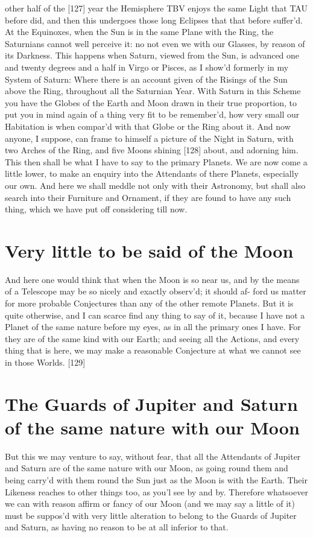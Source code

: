 \documentclass[letterpaper]{book}
\begin{document}
other half of the [127] year the Hemisphere TBV enjoys the same Light that
TAU before did, and then this undergoes those long Eclipses that that before
suffer'd. At the Equinoxes, when the Sun is in the same Plane with the Ring,
the Saturnians cannot well perceive it: no not even we with our Glasses, by
reason of its Darkness. This happens when Saturn, viewed from the Sun, is
advanced one and twenty degrees and a half in Virgo or Pisces, as I show'd
formerly in my System of Saturn: Where there is an account given of the
Risings of the Sun above the Ring, throughout all the Saturnian Year.  With
Saturn in this Scheme you have the Globes of the Earth and Moon drawn in
their true proportion, to put you in mind again of a thing very fit to be
remember'd, how very small our Habitation is when compar'd with that Globe
or the Ring about it. And now anyone, I suppose, can frame to himself a
picture of the Night in Saturn, with two Arches of the Ring, and five Moons
shining [128] about, and adorning him. This then shall be what I have to say
to the primary Planets.  We are now come a little lower, to make an enquiry
into the Attendants of there Planets, especially our own. And here we shall
meddle not only with their Astronomy, but shall also search into their
Furniture and Ornament, if they are found to have any such thing, which we
have put off considering till now.


\section{Very little to be said of the Moon}

And here one would think that when the Moon is so near us, and by the
means of a Telescope may be so nicely and exactly observ'd; it should af-
ford us matter for more probable Conjectures than any of the other remote
Planets. But it is quite otherwise, and I can scarce find any thing to say
of it, because I have not a Planet of the same nature before my eyes, as in
all the primary ones I have. For they are of the same kind with our Earth;
and seeing all the Actions, and every thing that is here, we may make a
reasonable Conjecture at what we cannot see in those Worlds.
[129]


\section{The Guards of Jupiter and Saturn of the same nature with our Moon}

But this we may venture to say, without fear, that all the Attendants of
Jupiter and Saturn are of the same nature with our Moon, as going round
them and being carry'd with them round the Sun just as the Moon is with
the Earth. Their Likeness reaches to other things too, as you'l see by and
by. Therefore whatsoever we can with reason affirm or fancy of our Moon
(and we may say a little of it) must be suppos'd with very little alteration
to belong to the Guards of Jupiter and Saturn, as having no reason to be
at all inferior to that.
\end{document}
